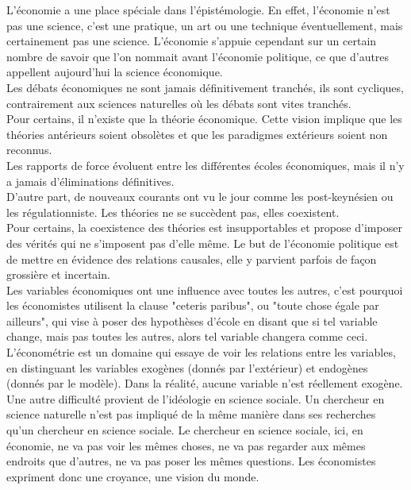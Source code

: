 \documentclass[10pt, a4paper, openany]{book}
\begin{document}
L'économie a une place spéciale dans l'épistémologie. En effet, l'économie n'est pas une science, c'est une pratique, un art ou une technique éventuellement, mais certainement pas une science. L'économie s'appuie cependant sur un certain nombre de savoir que l'on nommait avant l'économie politique, ce que d'autres appellent aujourd'hui la science économique. \\
Les débats économiques ne sont jamais définitivement tranchés, ils sont cycliques, contrairement aux sciences naturelles où les débats sont vites tranchés. \\
Pour certains, il n'existe que la théorie économique. Cette vision implique que les théories antérieurs soient obsolètes et que les paradigmes extérieurs soient non reconnus. \\
Les rapports de force évoluent entre les différentes écoles économiques, mais il n'y a jamais d'éliminations définitives. \\
D'autre part, de nouveaux courants ont vu le jour comme les post-keynésien ou les régulationniste. Les théories ne se succèdent pas, elles coexistent. \\
Pour certains, la coexistence des théories est insupportables et propose d'imposer des vérités qui ne s'imposent pas d'elle même. Le but de l'économie politique est de mettre en évidence des relations causales, elle y parvient parfois de façon grossière et incertain. \\
Les variables économiques ont une influence avec toutes les autres, c'est pourquoi les économistes utilisent la clause "ceteris paribus", ou "toute chose égale par ailleurs", qui vise à poser des hypothèses d'école en disant que si tel variable change, mais pas toutes les autres, alors tel variable changera comme ceci. \\
L'économétrie est un domaine qui essaye de voir les relations entre les variables, en distinguant les variables exogènes (donnés par l'extérieur) et endogènes (donnés par le modèle). Dans la réalité, aucune variable n'est réellement exogène. \\
Une autre difficulté provient de l'idéologie en science sociale. Un chercheur en science naturelle n'est pas impliqué de la même manière dans ses recherches qu'un chercheur en science sociale. Le chercheur en science sociale, ici, en économie, ne va pas voir les mêmes choses, ne va pas regarder aux mêmes endroits que d'autres, ne va pas poser les mêmes questions. Les économistes expriment donc une croyance, une vision du monde. 
\end{document}
